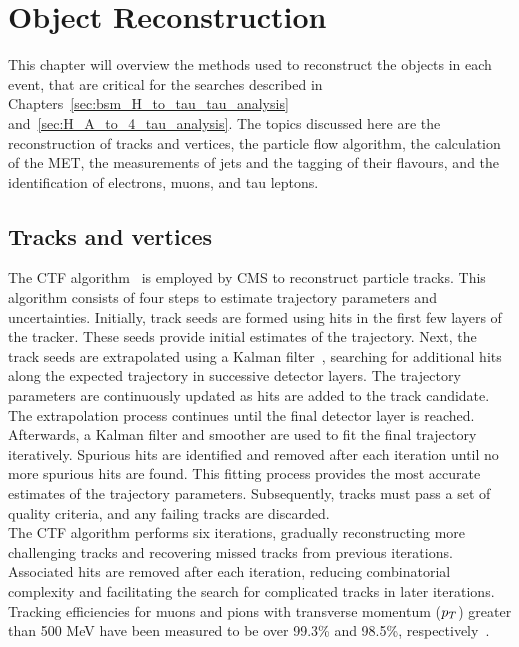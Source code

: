 \chapter{Object Reconstruction}
\label{sec:object_reconstruction}

This chapter will overview the methods used to reconstruct the objects in each event, that are critical for the searches described in Chapters~\ref{sec:bsm_H_to_tau_tau_analysis} and~\ref{sec:H_A_to_4_tau_analysis}.
The topics discussed here are the reconstruction of tracks and vertices, the particle flow algorithm, the calculation of the \ac{MET}, the measurements of jets and the tagging of their flavours, and the identification of electrons, muons, and tau leptons.

\section{Tracks and vertices}

The \ac{CTF} algorithm~\cite{CMS:2014pgm} is employed by \ac{CMS} to reconstruct particle tracks. 
This algorithm consists of four steps to estimate trajectory parameters and uncertainties. 
Initially, track seeds are formed using hits in the first few layers of the tracker. 
These seeds provide initial estimates of the trajectory. 
Next, the track seeds are extrapolated using a Kalman filter~\cite{Fruhwirth:1987fm}, searching for additional hits along the expected trajectory in successive detector layers. 
The trajectory parameters are continuously updated as hits are added to the track candidate. 
The extrapolation process continues until the final detector layer is reached. \\

Afterwards, a Kalman filter and smoother are used to fit the final trajectory iteratively. 
Spurious hits are identified and removed after each iteration until no more spurious hits are found. 
This fitting process provides the most accurate estimates of the trajectory parameters. 
Subsequently, tracks must pass a set of quality criteria, and any failing tracks are discarded. \\

The \ac{CTF} algorithm performs six iterations, gradually reconstructing more challenging tracks and recovering missed tracks from previous iterations. 
Associated hits are removed after each iteration, reducing combinatorial complexity and facilitating the search for complicated tracks in later iterations. 
Tracking efficiencies for muons and pions with transverse momentum ($p_{T}$) greater than 500 MeV have been measured to be over 99.3\% and 98.5\%, respectively~\cite{CMS:2010mua}. \\

